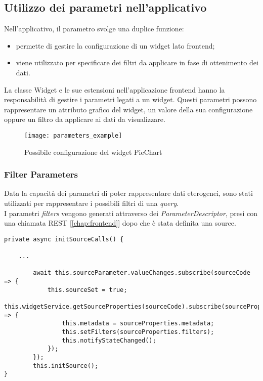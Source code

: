 \subsection{Utilizzo dei parametri nell'applicativo}
Nell'applicativo, il parametro svolge una duplice funzione:
\begin{itemize}
\item permette di gestire la configurazione di un widget lato frontend;
\item viene utilizzato per specificare dei filtri da applicare in fase di ottenimento dei dati.
\end{itemize}
La classe Widget e le sue estensioni nell'applicazione frontend hanno la responsabilità di gestire i parametri legati a un widget. Questi parametri possono rappresentare un attributo grafico del widget, un valore della sua configurazione oppure un filtro da applicare ai dati da visualizzare.
\begin{figure}[h!]
\begin{center}
\texttt{[image: parameters\_example]}\\
\caption{Possibile configurazione del widget PieChart}
\end{center}
\end{figure}
\subsubsection{Filter Parameters}
Data la capacità dei parametri di poter rappresentare dati eterogenei, sono stati utilizzati per rappresentare i possibili filtri di una \textit{query}.\\
I parametri \textit{filters} vengono generati attraverso dei \textit{ParameterDescriptor}, presi con una chiamata REST [\ref{chap:frontend}] dopo che è stata definita una source.
\begin{lstlisting}[caption={initSourceCalls, base-widget.ts},style=javascriptCode]
private async initSourceCalls() {

	...
	
        await this.sourceParameter.valueChanges.subscribe(sourceCode => {
            this.sourceSet = true;
            this.widgetService.getSourceProperties(sourceCode).subscribe(sourceProperties => {
                this.metadata = sourceProperties.metadata;
                this.setFilters(sourceProperties.filters);
                this.notifyStateChanged();
            });
        });
        this.initSource();
}
\end{lstlisting}